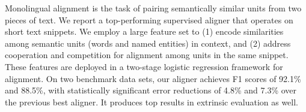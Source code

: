 Monolingual alignment is the task of pairing semantically similar units from two pieces of text. We report a top-performing supervised aligner that operates on short text snippets. We employ a large feature set to (1) encode similarities among semantic units (words and named entities) in context, and (2) address cooperation and competition for alignment among units in the same snippet. These features are deployed in a two-stage logistic regression framework for alignment. On two benchmark data sets, our aligner achieves F1 scores of 92.1\% and 88.5\%, with statistically significant error reductions of 4.8\% and 7.3\% over the previous best aligner. It produces top results in extrinsic evaluation as well.
